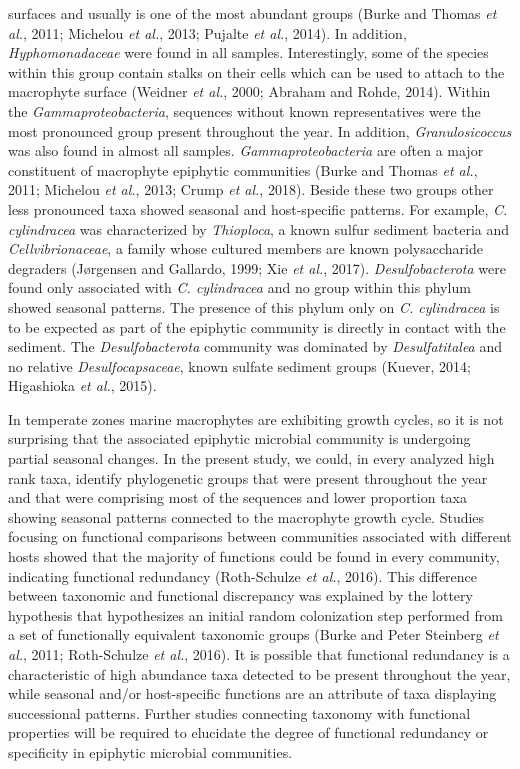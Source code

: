 \documentclass[12pt,]{article}
\begin{document}
surfaces and usually is one of the most abundant groups (Burke and
Thomas \emph{et al.}, 2011; Michelou \emph{et al.}, 2013; Pujalte
\emph{et al.}, 2014). In addition, \emph{Hyphomonadaceae} were found in
all samples. Interestingly, some of the species within this group
contain stalks on their cells which can be used to attach to the
macrophyte surface (Weidner \emph{et al.}, 2000; Abraham and Rohde,
2014). Within the \emph{Gammaproteobacteria}, sequences without known
representatives were the most pronounced group present throughout the
year. In addition, \emph{Granulosicoccus} was also found in almost all
samples. \emph{Gammaproteobacteria} are often a major constituent of
macrophyte epiphytic communities (Burke and Thomas \emph{et al.}, 2011;
Michelou \emph{et al.}, 2013; Crump \emph{et al.}, 2018). Beside these
two groups other less pronounced taxa showed seasonal and host-specific
patterns. For example, \emph{C. cylindracea} was characterized by
\emph{Thioploca}, a known sulfur sediment bacteria and
\emph{Cellvibrionaceae}, a family whose cultured members are known
polysaccharide degraders (Jørgensen and Gallardo, 1999; Xie \emph{et
al.}, 2017). \emph{Desulfobacterota} were found only associated with
\emph{C. cylindracea} and no group within this phylum showed seasonal
patterns. The presence of this phylum only on \emph{C. cylindracea} is
to be expected as part of the epiphytic community is directly in contact
with the sediment. The \emph{Desulfobacterota} community was dominated
by \emph{Desulfatitalea} and no relative \emph{Desulfocapsaceae}, known
sulfate sediment groups (Kuever, 2014; Higashioka \emph{et al.}, 2015).

In temperate zones marine macrophytes are exhibiting growth cycles, so
it is not surprising that the associated epiphytic microbial community
is undergoing partial seasonal changes. In the present study, we could,
in every analyzed high rank taxa, identify phylogenetic groups that were
present throughout the year and that were comprising most of the
sequences and lower proportion taxa showing seasonal patterns connected
to the macrophyte growth cycle. Studies focusing on functional
comparisons between communities associated with different hosts showed
that the majority of functions could be found in every community,
indicating functional redundancy (Roth-Schulze \emph{et al.}, 2016).
This difference between taxonomic and functional discrepancy was
explained by the lottery hypothesis that hypothesizes an initial random
colonization step performed from a set of functionally equivalent
taxonomic groups (Burke and Peter Steinberg \emph{et al.}, 2011;
Roth-Schulze \emph{et al.}, 2016). It is possible that functional
redundancy is a characteristic of high abundance taxa detected to be
present throughout the year, while seasonal and/or host-specific
functions are an attribute of taxa displaying successional patterns.
Further studies connecting taxonomy with functional properties will be
required to elucidate the degree of functional redundancy or specificity
in epiphytic microbial communities.
\end{document}
